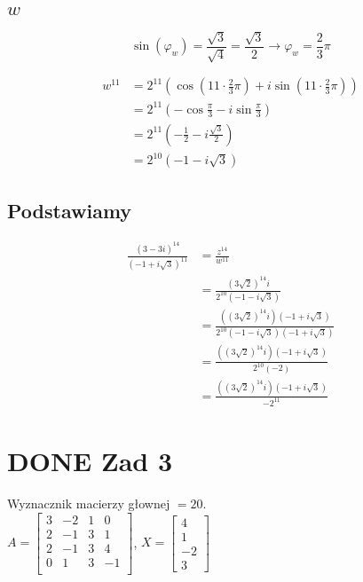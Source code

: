 \documentclass[11pt]{article}
\begin{document}
\subsection{\(w\)}
\label{sec:org95cc5fd}
$$\sin(\varphi_w) = \frac{\sqrt{3}}{\sqrt{4}} = \frac{\sqrt{3}}{2}
\to \varphi_w = \frac{2}{3} \pi$$

\begin{align*}
w^{11} &= 2^{11} \left( \cos \left(11 \cdot \frac{2}{3} \pi \right)
+ i \sin \left( 11 \cdot \frac{2}{3} \pi \right) \right)\\
&= 2^{11} \left( -\cos \frac{\pi}{3}
- i \sin \frac{\pi}{3} \right)\\
&= 2^{11} \left(- \frac{1}{2} - i \frac{\sqrt{3}}{2} \right)\\
&= 2^{10} \left(-1 - i \sqrt{3} \right)
\end{align*}
\subsection{Podstawiamy}
\label{sec:org44e8188}
\begin{align*}
\frac{ { (3 - 3i)}^{14} }
{ { (-1+i\sqrt{3}) }^{11} }
&= \frac{z^{14}}{w^{11}}\\
&=\frac{(3\sqrt{2})^{14} i }
{2^{10}(-1 -i\sqrt{3})}\\
&=\frac{ ((3\sqrt{2})^{14} i)(-1 + i\sqrt{3}) }
{2^{10}(-1 -i\sqrt{3})(-1 + i\sqrt{3})}\\
&=\frac{ ((3\sqrt{2})^{14} i)(-1 + i\sqrt{3}) }
{2^{10}(-2)}\\
&=\frac{ ((3\sqrt{2})^{14} i)(-1 + i\sqrt{3}) }
{-2^{11}}
\end{align*}
\section{{\bfseries\sffamily DONE} Zad 3}
\label{sec:orgc483e9a}
Wyznacznik macierzy głownej \(= 20\).
\\\empty
\(A = \begin{bmatrix}
3  & -2 & 1 & 0 \\
2  & -1 & 3 & 1 \\
2 & -1 & 3 & 4 \\
0 & 1 & 3 & -1 \\
\end{bmatrix}\),
\(X = \begin{bmatrix}
4\\
1\\
-2\\
3
\end{bmatrix}\)
\end{document}
